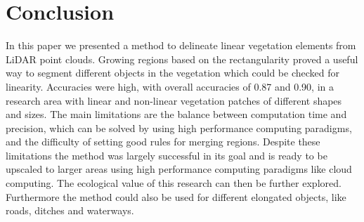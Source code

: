 \section{Conclusion}
In this paper we presented a method to delineate linear vegetation elements from LiDAR point clouds. Growing regions based on the rectangularity proved a useful way to segment different objects in the vegetation which could be checked for linearity. Accuracies were high, with overall accuracies of 0.87 and 0.90, in a research area with linear and non-linear vegetation patches of different shapes and sizes. The main limitations are the balance between computation time and precision, which can be solved by using high performance computing paradigms, and the difficulty of setting good rules for merging regions. Despite these limitations the method was largely successful in its goal and is ready to be upscaled to larger areas using high performance computing paradigms like cloud computing. The ecological value of this research can then be further explored. Furthermore the method could also be used for different elongated objects, like roads, ditches and waterways.
